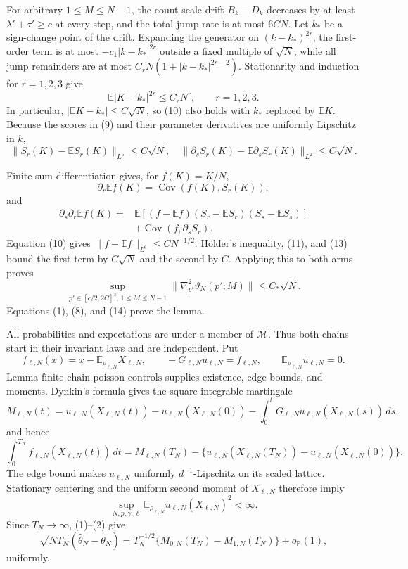 For arbitrary \(1\leq M\leq N-1\), the count-scale drift \(B_k-D_k\) decreases by at least \(\lambda'+\tau'\geq c\) at every step, and the total jump rate is at most \(6CN\).  Let \(k_*\) be a sign-change point of the drift.  Expanding the generator on \((k-k_*)^{2r}\), the first-order term is at most \(-c_1|k-k_*|^{2r}\) outside a fixed multiple of \(\sqrt N\), while all jump remainders are at most \(C_rN(1+|k-k_*|^{2r-2})\).  Stationarity and induction for \(r=1,2,3\) give
\[
 \mathbb E|K-k_*|^{2r}\leq C_rN^r,
 \qquad r=1,2,3.                                               \tag{10}
\]
In particular, \(|\mathbb EK-k_*|\leq C\sqrt N\), so (10) also holds with \(k_*\) replaced by \(\mathbb EK\).  Because the scores in (9) and their parameter derivatives are uniformly Lipschitz in \(k\),
\[
 \|S_r(K)-\mathbb ES_r(K)\|_{L^6}\leq C\sqrt N,
 \quad
 \|\partial_sS_r(K)-\mathbb E\partial_sS_r(K)\|_{L^2}
 \leq C\sqrt N.                                               \tag{11}
\]

Finite-sum differentiation gives, for \(f(K)=K/N\),
\[
 \partial_r\mathbb Ef(K)=\operatorname{Cov}(f(K),S_r(K)),     \tag{12}
\]
and
\[
 \begin{split}
 \partial_s\partial_r\mathbb Ef(K)
 ={}&\mathbb E[(f-\mathbb Ef)(S_r-\mathbb ES_r)(S_s-\mathbb ES_s)]\\
 &+\operatorname{Cov}(f,\partial_sS_r).                        \tag{13}
 \end{split}
\]
Equation (10) gives \(\|f-\mathbb Ef\|_{L^6}\leq C N^{-1/2}\).  H\"older's inequality, (11), and (13) bound the first term by \(C\sqrt N\) and the second by \(C\).  Applying this to both arms proves
\[
 \sup_{p'\in[c/2,2C]^3,\,1\leq M\leq N-1}
 \|\nabla_{p'}^2\vartheta_N(p';M)\|\leq C_*\sqrt N.          \tag{14}
\]
Equations (1), (8), and (14) prove the lemma.

All probabilities and expectations are under a member of \(\mathcal M\).  Thus both chains start in their invariant laws and are independent.  Put
\[
 f_{\ell,N}(x)=x-\mathbb E_{\rho_{\ell,N}}X_{\ell,N},
 \qquad
 -G_{\ell,N}u_{\ell,N}=f_{\ell,N},
 \qquad
 \mathbb E_{\rho_{\ell,N}}u_{\ell,N}=0.
\]
Lemma \(\mathrm{finite\mbox{-}chain\mbox{-}poisson\mbox{-}controls}\) supplies existence, edge bounds, and moments.  Dynkin's formula gives the square-integrable martingale
\[
 M_{\ell,N}(t)=u_{\ell,N}(X_{\ell,N}(t))-u_{\ell,N}(X_{\ell,N}(0))
 -\int_0^tG_{\ell,N}u_{\ell,N}(X_{\ell,N}(s))\,ds,
\]
and hence
\[
 \int_0^{T_N}f_{\ell,N}(X_{\ell,N}(t))\,dt
 =M_{\ell,N}(T_N)
 -\{u_{\ell,N}(X_{\ell,N}(T_N))-u_{\ell,N}(X_{\ell,N}(0))\}. \tag{1}
\]
The edge bound makes \(u_{\ell,N}\) uniformly \(d^{-1}\)-Lipschitz on its scaled lattice.  Stationary centering and the uniform second moment of \(X_{\ell,N}\) therefore imply
\[
 \sup_{N,p,\gamma,\ell}
 \mathbb E_{\rho_{\ell,N}}u_{\ell,N}(X_{\ell,N})^2<\infty.    \tag{2}
\]
Since \(T_N\to\infty\), (1)--(2) give
\[
 \sqrt{NT_N}(\widehat\theta_N-\theta_N)
 =T_N^{-1/2}\{M_{0,N}(T_N)-M_{1,N}(T_N)\}+o_{\mathbb P}(1),   \tag{3}
\]
uniformly.

